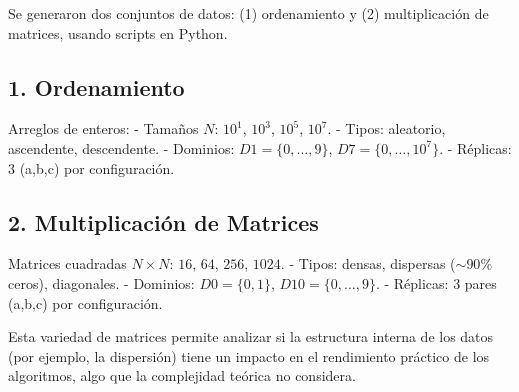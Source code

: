 Se generaron dos conjuntos de datos: (1) ordenamiento y (2) multiplicación de matrices, usando scripts en Python.

\subsection*{1. Ordenamiento}
Arreglos de enteros:  
- Tamaños $N$: $10^1$, $10^3$, $10^5$, $10^7$.  
- Tipos: aleatorio, ascendente, descendente.  
- Dominios: $D1=\{0,\ldots,9\}$, $D7=\{0,\ldots,10^7\}$.  
- Réplicas: 3 (a,b,c) por configuración.  

\subsection*{2. Multiplicación de Matrices}
Matrices cuadradas $N\times N$: $16$, $64$, $256$, $1024$.  
- Tipos: densas, dispersas ($\sim90\%$ ceros), diagonales.  
- Dominios: $D0=\{0,1\}$, $D10=\{0,\ldots,9\}$.  
- Réplicas: 3 pares (a,b,c) por configuración.  

\medskip
Esta variedad de matrices permite analizar si la estructura interna de los datos (por ejemplo, la dispersión) tiene un impacto en el rendimiento práctico de los algoritmos, algo que la complejidad teórica no considera.
\medskip